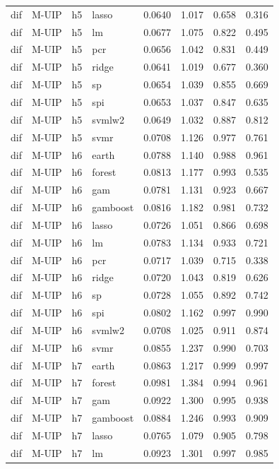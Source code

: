 \begin{ThreePartTable}
\begin{longtable}[t]{llclcccc}
dif & M-UIP & h5 & lasso & 0.0640 & 1.017 & 0.658 & 0.316\\
dif & M-UIP & h5 & lm & 0.0677 & 1.075 & 0.822 & 0.495\\
dif & M-UIP & h5 & pcr & 0.0656 & 1.042 & 0.831 & 0.449\\
dif & M-UIP & h5 & ridge & 0.0641 & 1.019 & 0.677 & 0.360\\
dif & M-UIP & h5 & sp & 0.0654 & 1.039 & 0.855 & 0.669\\
dif & M-UIP & h5 & spi & 0.0653 & 1.037 & 0.847 & 0.635\\
dif & M-UIP & h5 & svmlw2 & 0.0649 & 1.032 & 0.887 & 0.812\\
dif & M-UIP & h5 & svmr & 0.0708 & 1.126 & 0.977 & 0.761\\
\addlinespace
dif & M-UIP & h6 & earth & 0.0788 & 1.140 & 0.988 & 0.961\\
dif & M-UIP & h6 & forest & 0.0813 & 1.177 & 0.993 & 0.535\\
dif & M-UIP & h6 & gam & 0.0781 & 1.131 & 0.923 & 0.667\\
dif & M-UIP & h6 & gamboost & 0.0816 & 1.182 & 0.981 & 0.732\\
dif & M-UIP & h6 & lasso & 0.0726 & 1.051 & 0.866 & 0.698\\
dif & M-UIP & h6 & lm & 0.0783 & 1.134 & 0.933 & 0.721\\
dif & M-UIP & h6 & pcr & 0.0717 & 1.039 & 0.715 & 0.338\\
dif & M-UIP & h6 & ridge & 0.0720 & 1.043 & 0.819 & 0.626\\
dif & M-UIP & h6 & sp & 0.0728 & 1.055 & 0.892 & 0.742\\
dif & M-UIP & h6 & spi & 0.0802 & 1.162 & 0.997 & 0.990\\
dif & M-UIP & h6 & svmlw2 & 0.0708 & 1.025 & 0.911 & 0.874\\
dif & M-UIP & h6 & svmr & 0.0855 & 1.237 & 0.990 & 0.703\\
\addlinespace
dif & M-UIP & h7 & earth & 0.0863 & 1.217 & 0.999 & 0.997\\
dif & M-UIP & h7 & forest & 0.0981 & 1.384 & 0.994 & 0.961\\
dif & M-UIP & h7 & gam & 0.0922 & 1.300 & 0.995 & 0.938\\
dif & M-UIP & h7 & gamboost & 0.0884 & 1.246 & 0.993 & 0.909\\
dif & M-UIP & h7 & lasso & 0.0765 & 1.079 & 0.905 & 0.798\\
dif & M-UIP & h7 & lm & 0.0923 & 1.301 & 0.997 & 0.985\\

\end{longtable}
\end{ThreePartTable}
